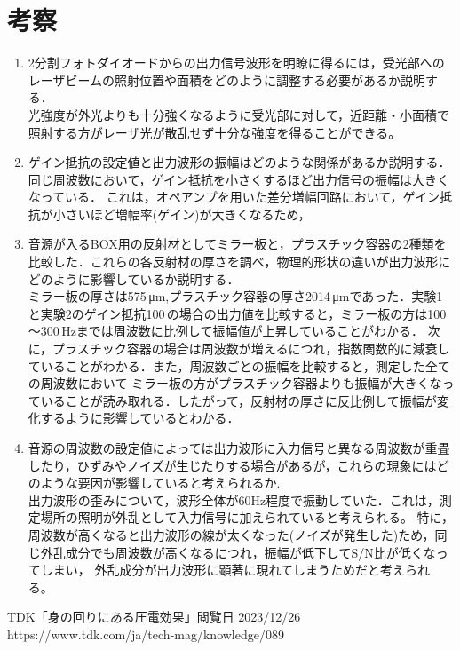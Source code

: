 \documentclass{ltjsarticle}
\begin{document}
\section{考察}
	\begin{enumerate}
		\item 2分割フォトダイオードからの出力信号波形を明瞭に得るには，受光部へのレーザビームの照射位置や面積をどのように調整する必要があるか説明する．\\
			光強度が外光よりも十分強くなるように受光部に対して，近距離・小面積で照射する方がレーザ光が散乱せず十分な強度を得ることができる。
		\item ゲイン抵抗の設定値と出力波形の振幅はどのような関係があるか説明する．\\
			同じ周波数において，ゲイン抵抗を小さくするほど出力信号の振幅は大きくなっている．
			これは，オペアンプを用いた差分増幅回路において，ゲイン抵抗が小さいほど増幅率(ゲイン)が大きくなるため，
		\item 音源が入るBOX用の反射材としてミラー板と，プラスチック容器の2種類を比較した．これらの各反射材の厚さを調べ，物理的形状の違いが出力波形にどのように影響しているか説明する．\\
			ミラー板の厚さは575\,μm,プラスチック容器の厚さ2014\,μmであった．実験1と実験2のゲイン抵抗100\,\Omega の場合の出力値を比較すると，ミラー板の方は100～300\,Hzまでは周波数に比例して振幅値が上昇していることがわかる．
			次に，プラスチック容器の場合は周波数が増えるにつれ，指数関数的に減衰していることがわかる．また，周波数ごとの振幅を比較すると，測定した全ての周波数において
			ミラー板の方がプラスチック容器よりも振幅が大きくなっていることが読み取れる．したがって，反射材の厚さに反比例して振幅が変化するように影響しているとわかる．
		\item 音源の周波数の設定値によっては出力波形に入力信号と異なる周波数が重畳したり，ひずみやノイズが生じたりする場合があるが，これらの現象にはどのような要因が影響していると考えられるか.\\
			出力波形の歪みについて，波形全体が60Hz程度で振動していた．これは，測定場所の照明が外乱として入力信号に加えられていると考えられる。
			特に，周波数が高くなると出力波形の線が太くなった(ノイズが発生した)ため，同じ外乱成分でも周波数が高くなるにつれ，振幅が低下してS/N比が低くなってしまい，
			外乱成分が出力波形に顕著に現れてしまうためだと考えられる。
	\end{enumerate}
\begin{thebibliography}{99}
	TDK「身の回りにある圧電効果」閲覧日 2023/12/26\\
	https://www.tdk.com/ja/tech-mag/knowledge/089
\end{thebibliography}
\end{document}
